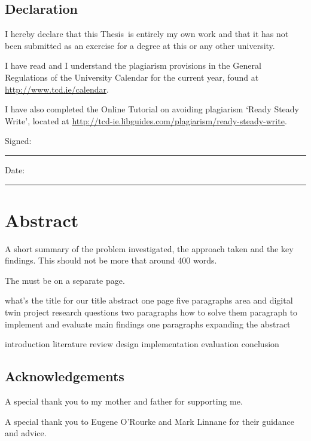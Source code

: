 \documentclass[a4paper,oneside,12pt]{book}
\title{\thesistitle}
\author{\authorname}
\newcommand{\typeofthesis}{Thesis} %
\begin{document}

\doublespacing

\section*{Declaration}
I hereby declare that this \typeofthesis\ is entirely my own work and that it has not been submitted as an exercise for a degree at this or any other university.

I have read and I understand the plagiarism provisions in the General Regulations of the University Calendar for the current year, found at \url{http://www.tcd.ie/calendar}.

I have also completed the Online Tutorial on avoiding plagiarism `Ready Steady Write', located at \url{http://tcd-ie.libguides.com/plagiarism/ready-steady-write}.
\vspace{1cm}

Signed:~\rule{5cm}{0.3pt}\hfill Date:~\rule{5cm}{0.3pt}


\newpage
\chapter{Abstract}
A short summary of the problem investigated, the approach taken and the key findings. This should not be more that around 400 words.

The must be on a separate page.


what’s the title for our title
abstract one page
five paragraphs 
area and digital twin
project research questions
two paragraphs how to solve them 
paragraph to implement and evaluate
main findings one paragraphs
expanding the abstract


introduction
literature review 
design implementation
evaluation
conclusion





\newpage
\raggedright %

\section*{\Huge{Acknowledgements}}

A special thank you to my mother and father for supporting me.

A special thank you to Eugene O'Rourke and Mark Linnane for their guidance and advice.
\end{document}
